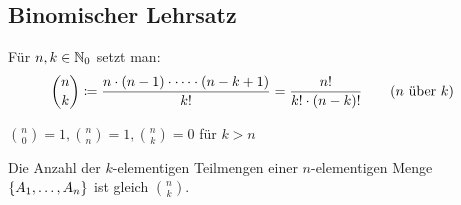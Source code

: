 \subsection{Binomischer Lehrsatz}
\begin{definition}[Binomialkoeffizient]
    Für $n,k\in\mathbb{N}_0$ setzt man:
    \begin{align*}
        \binom{n}{k} &\coloneqq \frac{n\cdot(n-1)\cdot\dots\cdot(n-k+1)}{k!} = \frac{n!}{k!\cdot(n-k)!} \tag{$n$ über $k$}
    \end{align*}
\end{definition}
\begin{bemerkung}
    $\binom{n}{0} = 1, \binom{n}{n} = 1, \binom{n}{k} = 0$ für $k>n$
\end{bemerkung}

\begin{satz}
    \label{satz:teilmengen-anzahl}
    Die Anzahl der $k$-elementigen Teilmengen einer $n$-elementigen Menge $\left\{A_1, \dots, A_n\right\}$ ist gleich $\binom{n}{k}$.
\end{satz}

